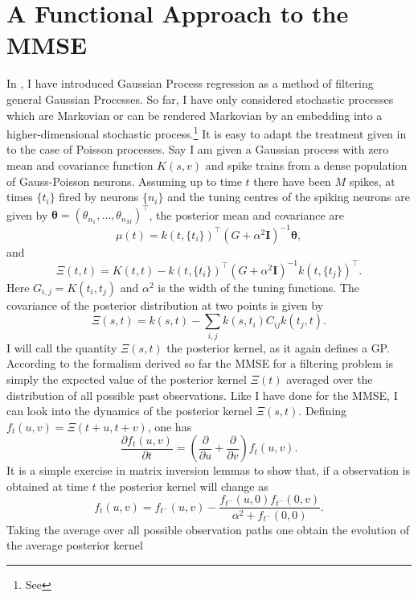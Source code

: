 \section{A Functional Approach to the MMSE}

\label{sec:kernels}

In , I have introduced Gaussian Process regression as a method of filtering general Gaussian Processes. So far, I have only considered stochastic processes
which are Markovian or can be rendered Markovian by an embedding into a higher-dimensional stochastic process.\footnote{See } It is easy to adapt the
treatment given in  to the case of Poisson processes. Say I am given a Gaussian process with zero mean and covariance function $K(s,v)$ and spike trains
from a dense population of Gauss-Poisson neurons. Assuming up to time $t$ there have been $M$ spikes, at times $\{t_i\}$ fired 
by neurons $\{n_i\}$ and the tuning centres of the spiking neurons are given by $\boldsymbol{\theta} = (\theta_{n_1}, \ldots, \theta_{n_M})^\top$, the posterior mean and covariance are
\begin{equation}
\mu(t) = k(t,\{t_i\})^\top (G + \alpha^2 \boldsymbol{I})^{-1} \boldsymbol{\theta},
\end{equation}
and
\begin{equation}
\Xi(t,t) =  K(t,t) - k(t,\{t_i\})^\top (G+\alpha^2\boldsymbol{I})^{-1} k(t,\{t_j\})^\top.
\end{equation}
Here $G_{i,j} = K(t_i,t_j)$ and $\alpha^2$ is the width of the tuning functions. The covariance of the posterior distribution at two
points is given by
\[
\Xi(s,t) = k(s,t) - \sum_{i,j} k(s,t_i) C_{ij} k(t_j,t).
\]
I will call the quantity $\Xi(s,t)$ the posterior kernel, as it again defines a GP. According to the formalism derived so far the MMSE for a filtering 
problem is simply the expected value of the posterior kernel $\Xi(t)$ averaged over the distribution of all possible past observations. Like I have done for the 
MMSE, I can look into the dynamics of the posterior kernel $\Xi(s,t)$. Defining $f_t(u,v) = \Xi(t+u,t+v)$, one has
\[
\frac{\partial f_t(u,v)}{\partial t} = \left( \frac{\partial }{\partial u}+ \frac{\partial }{\partial v}\right) f_t(u,v).
\]
It is a simple exercise in matrix inversion lemmas to show that, if a observation is obtained at time $t$ the posterior kernel will change as
\[
f_t(u,v) = f_{t^-}(u,v) - \frac{f_{t^-}(u,0)f_{t^-}(0,v)}{\alpha^2+ f_{t^-}(0,0)}.
\]
Taking the average over all possible observation paths one obtain the evolution of the average posterior kernel
